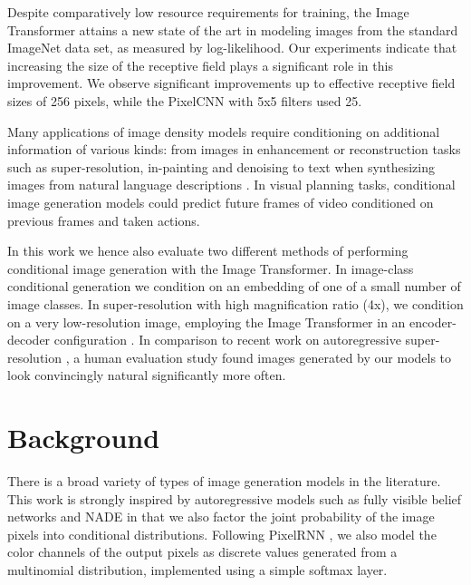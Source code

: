 \documentclass{article}
\begin{document}
Despite comparatively low resource requirements for training, the Image Transformer attains a new state of the art in modeling images from the standard ImageNet data set, as measured by log-likelihood. Our experiments indicate that increasing the size of the receptive field plays a significant role in this improvement. We observe significant improvements up to effective receptive field sizes of 256 pixels, while the PixelCNN \cite{PixelCNN} with 5x5 filters used 25.

Many applications of image density models require conditioning on additional information of various kinds: from images in enhancement or reconstruction tasks such as super-resolution, in-painting and denoising to text when synthesizing images from natural language descriptions \cite{Mansimov15}. In visual planning tasks, conditional image generation models could predict future frames of video conditioned on previous frames and taken actions.

In this work we hence also evaluate two different methods of performing conditional image generation with the Image Transformer. In image-class conditional generation we condition on an embedding of one of a small number of image classes. In super-resolution with high magnification ratio (4x), we condition on a very low-resolution image, employing the Image Transformer in an encoder-decoder configuration \cite{KalchbrennerB13}. In comparison to recent work on autoregressive super-resolution \cite{PixelRecursiveSuperResolution}, a human evaluation study found images generated by our models to look convincingly natural significantly more often.














%
 
\section{Background}
There is a broad variety of types of image generation models in the literature. This work is strongly inspired by autoregressive models such as fully visible belief networks and NADE \citep{Bengio00, larochelle2011} in that we also factor the joint probability of the image pixels into conditional distributions. Following PixelRNN \citep{PixelRNN}, we also model the color channels of the output pixels as discrete values generated from a multinomial distribution, implemented using a simple softmax layer.
\end{document}

